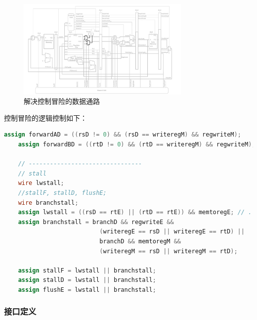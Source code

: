 \begin{figure}[H]
	\centering
	\includegraphics[width=0.75\textwidth]{figure/解决控制冒险的数据通路.png}
	\caption{解决控制冒险的数据通路}
	\label{fig:control_hazard_data_path}
\end{figure}
控制冒险的逻辑控制如下：
\begin{lstlisting}[language=Verilog,caption={控制冒险逻辑控制},label={lst:control_hazard_logic}]
	assign forwardAD = ((rsD != 0) && (rsD == writeregM) && regwriteM);
	assign forwardBD = ((rtD != 0) && (rtD == writeregM) && regwriteM);
	
	// --------------------------------
	// stall
	wire lwstall;
	//stallF, stallD, flushE;
	wire branchstall;
	assign lwstall = ((rsD == rtE) || (rtD == rtE)) && memtoregE; // . 判断 decode 阶段 rs 或 rt 的地址是否是 lw 指令要写入的地址；
	assign branchstall = branchD && regwriteE && 
						   (writeregE == rsD || writeregE == rtD) ||
						   branchD && memtoregM &&
						   (writeregM == rsD || writeregM == rtD);
	
	assign stallF = lwstall || branchstall;
	assign stallD = lwstall || branchstall;
	assign flushE = lwstall || branchstall;
\end{lstlisting}
\subsubsection{接口定义}


